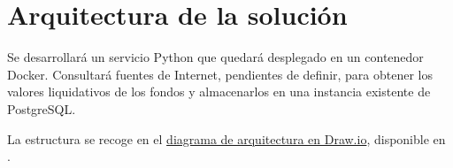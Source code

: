 \chapter{Arquitectura de la solución}

Se desarrollará un servicio Python que quedará desplegado en un contenedor
Docker. Consultará fuentes de Internet, pendientes de definir, para obtener
los valores liquidativos de los fondos y almacenarlos en una instancia
existente de PostgreSQL.

La estructura se recoge en el
\href{run:../../design/arquitectura.drawio}{diagrama de arquitectura en Draw.io},
disponible en .

